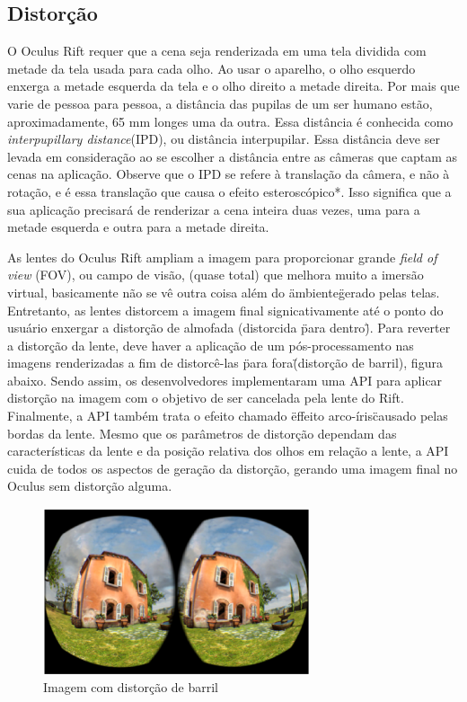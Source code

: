 \subsection{Distorção}
O Oculus Rift requer que a cena seja renderizada em uma tela dividida com metade da tela usada para cada olho. Ao usar o aparelho, o olho esquerdo enxerga a metade esquerda da tela e o olho direito a metade direita. Por mais que varie de pessoa para pessoa, a distância das pupilas de um ser humano estão, aproximadamente, 65 mm longes uma da outra. Essa distância é conhecida como \textit{interpupillary distance}(IPD), ou distância interpupilar. Essa distância deve ser levada em consideração ao se escolher a distância entre as câmeras que captam as cenas na aplicação. Observe que o IPD se refere à translação da câmera, e não à rotação, e é essa translação que causa o efeito esteroscópico*. Isso significa que a sua aplicação precisará de renderizar a cena inteira duas vezes, uma para a metade esquerda e outra para a metade direita. 

As lentes do Oculus Rift ampliam a imagem para proporcionar grande \textit{field of view} (FOV), ou campo de visão, (quase total) que melhora muito a imersão virtual, basicamente não se vê outra coisa além do \"ambiente\" gerado pelas telas. Entretanto, as lentes distorcem a imagem final signicativamente até o ponto do usuário enxergar a distorção de almofada (distorcida \"para dentro\"). Para reverter a distorção da lente, deve haver a aplicação de um pós-processamento nas imagens renderizadas a fim de distorcê-las \"para fora\" (distorção de barril), figura abaixo. Sendo assim, os desenvolvedores implementaram uma API para aplicar distorção na imagem com o objetivo de ser cancelada pela lente do Rift. Finalmente, a API também trata o efeito chamado \"effeito arco-íris\" causado pelas bordas da lente. Mesmo que os parâmetros de distorção dependam das características da lente e da posição relativa dos olhos em relação a lente, a API cuida de todos os aspectos de geração da distorção, gerando uma imagem final no Oculus sem distorção alguma.

\begin{figure}[h]
  \centering
  \includegraphics[width=0.7\textwidth]
      {figuras/distorcao_barril.eps}
  \caption{Imagem com distorção de barril}
  \label{coordenadas-rift}
\end{figure}

